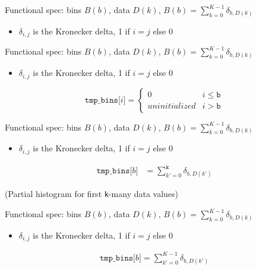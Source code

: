 {\LARGE

Functional spec: bins $B(b)$, data $D(k)$, $B(b) = \sum_{k=0}^{K-1} \delta_{b, D(k)}$
\begin{itemize}
    \item $\delta_{i,j}$ is the Kronecker delta, 1 if $i = j$ else 0
\end{itemize}

}

\newpage
{}

{\large

}

{\LARGE

Functional spec: bins $B(b)$, data $D(k)$, $B(b) = \sum_{k=0}^{K-1} \delta_{b, D(k)}$
\begin{itemize}
    \item $\delta_{i,j}$ is the Kronecker delta, 1 if $i = j$ else 0
\end{itemize}

\begin{equation*}
\texttt{tmp\_bins[$i$]} =
\begin{cases}
    0 & i \le \texttt{b} \\
    \textit{uninitialized} & i > \texttt{b}
\end{cases}
\end{equation*}

}

\newpage
{}

{\large

}

{\LARGE

Functional spec: bins $B(b)$, data $D(k)$, $B(b) = \sum_{k=0}^{K-1} \delta_{b, D(k)}$
\begin{itemize}
    \item $\delta_{i,j}$ is the Kronecker delta, 1 if $i = j$ else 0
\end{itemize}

\begin{align*}
\texttt{tmp\_bins[$b$]} &= \sum_{k'=0}^{\texttt{k}} \delta_{b, D(k')}
\end{align*}

(Partial histogram for first \texttt{k}-many data values)

}

\newpage
{}

{\large

}

{\LARGE

Functional spec: bins $B(b)$, data $D(k)$, $B(b) = \sum_{k=0}^{K-1} \delta_{b, D(k)}$
\begin{itemize}
    \item $\delta_{i,j}$ is the Kronecker delta, 1 if $i = j$ else 0
\end{itemize}

\begin{align*}
\texttt{tmp\_bins[$b$]} = \sum_{k'=0}^{K-1} \delta_{b, D(k')}
\end{align*}

}

